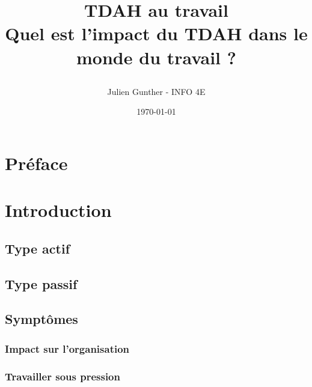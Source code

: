 \documentclass[a4paper, 11pt]{report}
\begin{document}
\begin{title}

\author{Julien Gunther - INFO 4E}
\title{
    {\Huge TDAH au travail}\\
    \vspace{1 cm}
    \vspace{3 cm}
    {\Large Quel est l'impact du TDAH dans le monde du travail ?}\\
    \vspace{1 cm}
    {\date{\Large \today}}}
\end{title}
\maketitle
\clearpage

\tableofcontents
\clearpage

\section{Préface}

\clearpage



\section{Introduction}

\subsection{Type actif}

\subsection{Type passif}

\subsection{Symptômes}

\subsubsection{Impact sur l'organisation}

\subsubsection{Travailler sous pression}

\end{document}

